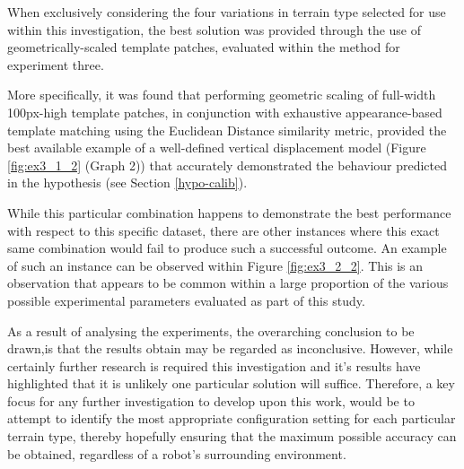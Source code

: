 When exclusively considering the four variations in terrain type selected for use within this investigation, the best solution was provided through the use of geometrically-scaled template patches, evaluated within the method for experiment three.

More specifically, it was found that performing geometric scaling of full-width 100px-high template patches, in conjunction with exhaustive appearance-based template matching using the Euclidean Distance similarity metric, provided the best available example of a well-defined vertical displacement model (Figure \ref{fig:ex3_1_2} (Graph 2)) that accurately demonstrated the behaviour predicted in the hypothesis (see Section \ref{hypo-calib}).

While this particular combination happens to demonstrate the best performance with respect to this specific dataset, there are other instances where this exact same combination would fail to produce such a successful outcome. An example of such an instance can be observed within Figure \ref{fig:ex3_2_2}. This is an observation that appears to be common within a large proportion of the various possible experimental parameters evaluated as part of this study. 

As a result of analysing the experiments, the overarching conclusion to be drawn,is that the results obtain may be regarded as inconclusive. However, while certainly further research is required this investigation and it's results have highlighted that it is unlikely one particular solution will suffice. Therefore, a key focus for any further investigation to develop upon this work, would be to attempt to identify the most appropriate configuration setting for each particular terrain type, thereby hopefully ensuring that the maximum possible accuracy can be obtained, regardless of a robot's surrounding environment. 
  

 
  

